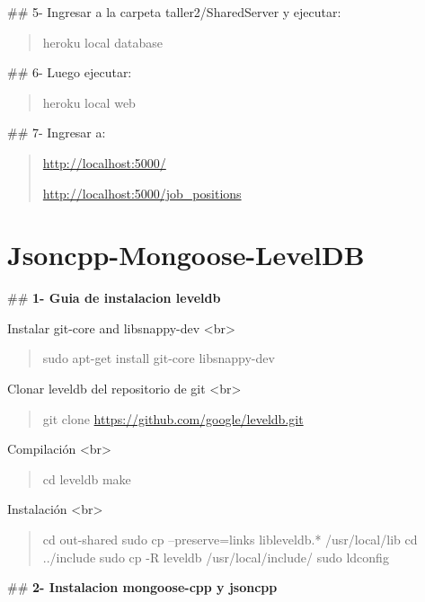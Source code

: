 \documentclass[letterpaper,10pt,spanish]{sphinxmanual}
\begin{document}
\#\# 5- Ingresar a la carpeta taller2/SharedServer y ejecutar:
\begin{quote}

heroku local database
\end{quote}

\#\# 6- Luego ejecutar:
\begin{quote}

heroku local web
\end{quote}

\#\# 7- Ingresar a:
\begin{quote}

\url{http://localhost:5000/}

\url{http://localhost:5000/job\_positions}
\end{quote}


\section{Jsoncpp-Mongoose-LevelDB}
\label{Jsoncpp-Mongoose-LevelDB:jsoncpp-mongoose-leveldb}\label{Jsoncpp-Mongoose-LevelDB::doc}
\#\# \textbf{1- Guia de instalacion leveldb}

Instalar git-core and libsnappy-dev \textless{}br\textgreater{}
\begin{quote}

sudo apt-get install git-core libsnappy-dev
\end{quote}

Clonar leveldb del repositorio de git \textless{}br\textgreater{}
\begin{quote}

git clone  \url{https://github.com/google/leveldb.git}
\end{quote}

Compilación \textless{}br\textgreater{}
\begin{quote}

cd leveldb
make
\end{quote}

Instalación \textless{}br\textgreater{}
\begin{quote}

cd out-shared
sudo cp --preserve=links libleveldb.* /usr/local/lib
cd ../include
sudo cp -R leveldb /usr/local/include/
sudo ldconfig
\end{quote}

\#\# \textbf{2- Instalacion mongoose-cpp y jsoncpp}
\end{document}
